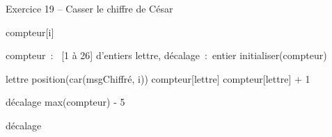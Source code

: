 \begin{Emphase}{Exercice 19 -- Casser le chiffre de César}

\begin{pseudoN}




            \Let compteur[i] 

        \EndFor

    \EndModule

   \Empty


        \Decl compteur~:~ [1 à 26] d’entiers
        \Decl lettre, décalage~:~entier
        \Decl initialiser(compteur)

            \Let lettre \Gets position(car(msgChiffré, i))
            \Let compteur[lettre] \Gets compteur[lettre] + 1 

        \EndFor

        \Let décalage \Gets max(compteur) - 5

        \Write décalage

    \EndModule

\end{pseudoN}
\end{Emphase}
    



